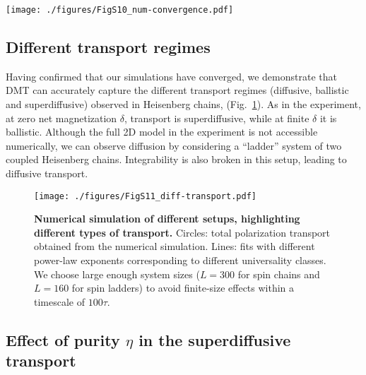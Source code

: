 \documentclass[
 reprint,
 superscriptaddress,
 amsmath,amssymb,
 aps,
 pra,
]{revtex4-2}
\begin{document}
\begin{figure*}[t!]
    \centering
    \texttt{[image: ./figures/FigS10\_num-convergence.pdf]}
    \caption{\textbf{Convergence of DMT simulation}.
        (\textbf{A}, \textbf{B}) Convergence with respect to the Trotter step length $dt$.
        (\textbf{C}, \textbf{D}) Convergence with respect to the bond dimension $\chi$.
        The spin profiles are measured at time $t/\tau = 20$. 
        While in this plot we only show the numerics for $\eta=0.1$, we also observe the same convergence in simulation for other parameter values. 
    }
    \label{fig:num-convergence}
\end{figure*}

\subsection{Different transport regimes}

Having confirmed that our simulations have converged, we demonstrate that DMT can accurately capture the different transport regimes (diffusive, ballistic and superdiffusive) observed in Heisenberg chains, (Fig.~\ref{fig:num-regimes}). As in the experiment, at zero net magnetization $\delta$, transport is superdiffusive, while at finite $\delta$ it is ballistic. Although the full 2D model in the experiment is not accessible numerically, we can observe diffusion by considering a ``ladder'' system of two coupled Heisenberg chains. Integrability is also broken in this setup, leading to diffusive transport.

\begin{figure}[t!]
    \centering
    \texttt{[image: ./figures/FigS11\_diff-transport.pdf]}
    \caption{\textbf{Numerical simulation of different setups, highlighting different types of transport.}
        Circles: total polarization transport obtained from the numerical simulation. Lines: fits with different power-law exponents corresponding to different universality classes.
        We choose large enough system sizes ($L=300$ for spin chains and $L=160$ for spin ladders) to avoid finite-size effects within a timescale of $100\tau$. 
    }
    \label{fig:num-regimes}
\end{figure}

\subsection{\label{subsec:num-purity}Effect of purity $\eta$ in the superdiffusive transport}
\end{document}
